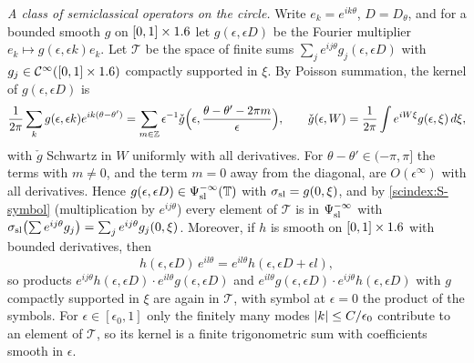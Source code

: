 \emph{A class of semiclassical operators on the circle.} Write $e_k=e^{ik\theta}$,
$D=D_\theta$, and for a bounded smooth $g$ on $[0,1]\times1.6$ let $g(\epsilon,\epsilon D)$
be the Fourier multiplier $e_k\mapsto g(\epsilon,\epsilon k)e_k$. Let $\mathcal T$ be
the space of finite sums $\sum_je^{ij\theta}g_j(\epsilon,\epsilon D)$ with
$g_j\in\mathcal{C}^\infty([0,1]\times1.6)$ compactly supported in $\xi$. By Poisson summation, the
kernel of $g(\epsilon,\epsilon D)$ is
\begin{equation*}
  \frac1{2\pi}\sum_kg(\epsilon,\epsilon k)e^{ik(\theta-\theta')}
  =\sum_{m\in\mathbb{Z}}\epsilon^{-1}\check g\Bigl(\epsilon,\frac{\theta-\theta'-2\pi m}\epsilon\Bigr),
  \qquad\check g(\epsilon,W)=\frac1{2\pi}\int e^{iW\xi}g(\epsilon,\xi)\,d\xi,
\end{equation*}
with $\check g$ Schwartz in $W$ uniformly with all derivatives. For
$\theta-\theta'\in(-\pi,\pi]$ the terms with $m\ne0$, and the term $m=0$ away from
the diagonal, are $O(\epsilon^\infty)$ with all derivatives. Hence
$g(\epsilon,\epsilon D)\in\Psi^{-\infty}_{\mathrm{sl}}(\mathbb{T})$ with $\sigma_{\mathrm{sl}}=g(0,\xi)$, and by
\ref{scindex:S-symbol} (multiplication by $e^{ij\theta}$) every element of
$\mathcal T$ is in $\Psi^{-\infty}_{\mathrm{sl}}$ with $\sigma_{\mathrm{sl}}\bigl(\sum e^{ij\theta}g_j\bigr)=
\sum_je^{ij\theta}g_j(0,\xi)$. Moreover, if $h$ is smooth on $[0,1]\times1.6$ with
bounded derivatives, then
\begin{equation}\label{solsemiclassical-index:eq:shift}
  h(\epsilon,\epsilon D)\,e^{il\theta}=e^{il\theta}h(\epsilon,\epsilon D+\epsilon l),
\end{equation}
so products $e^{ij\theta}h(\epsilon,\epsilon D)\cdot e^{il\theta}g(\epsilon,\epsilon D)$
and $e^{il\theta}g(\epsilon,\epsilon D)\cdot e^{ij\theta}h(\epsilon,\epsilon D)$ with
$g$ compactly supported in $\xi$ are again in $\mathcal T$, with symbol at $\epsilon=0$
the product of the symbols. For $\epsilon\in[\epsilon_0,1]$ only the finitely many
modes $\lvert k\rvert\le C/\epsilon_0$ contribute to an element of $\mathcal T$, so its kernel
is a finite trigonometric sum with coefficients smooth in $\epsilon$.

